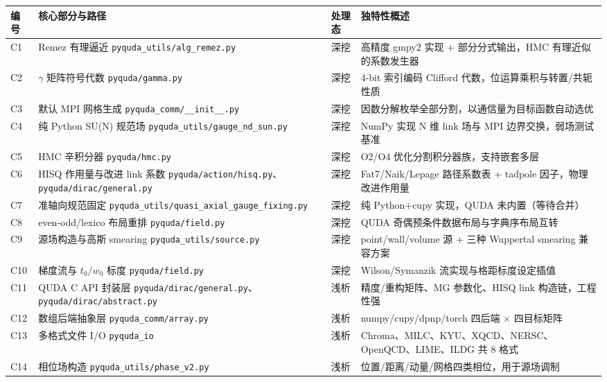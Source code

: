 \documentclass[UTF8]{ctexart}
\begin{document}
\begin{xltabular}{\textwidth}{lXlX}
\toprule
\textcolor{algo}{编号} & 核心部分与路径 & 处理态 & 独特性概述 \\
\midrule
\endhead
C1 & Remez 有理逼近 \texttt{\nolinkurl{pyquda_utils/alg_remez.py}} & 深挖 & 高精度 gmpy2 实现 + 部分分式输出，HMC 有理近似的系数发生器 \\
C2 & $\gamma$ 矩阵符号代数 \texttt{\nolinkurl{pyquda/gamma.py}} & 深挖 & 4-bit 索引编码 Clifford 代数，位运算乘积与转置/共轭性质 \\
C3 & 默认 MPI 网格生成 \texttt{\nolinkurl{pyquda_comm/__init__.py}} & 深挖 & 因数分解枚举全部分割，以通信量为目标函数自动选优 \\
C4 & 纯 Python SU(N) 规范场 \texttt{\nolinkurl{pyquda_utils/gauge_nd_sun.py}} & 深挖 & NumPy 实现 N 维 link 场与 MPI 边界交换，弱场测试基准 \\
C5 & HMC 辛积分器 \texttt{\nolinkurl{pyquda/hmc.py}} & 深挖 & O2/O4 优化分割积分器族，支持嵌套多层 \\
C6 & HISQ 作用量与改进 link 系数 \texttt{\nolinkurl{pyquda/action/hisq.py}}、\texttt{\nolinkurl{pyquda/dirac/general.py}} & 深挖 & Fat7/Naik/Lepage 路径系数表 + tadpole 因子，物理改进作用量 \\
C7 & 准轴向规范固定 \texttt{\nolinkurl{pyquda_utils/quasi_axial_gauge_fixing.py}} & 深挖 & 纯 Python+cupy 实现，QUDA 未内置（等待合并） \\
C8 & even-odd/lexico 布局重排 \texttt{\nolinkurl{pyquda/field.py}} & 深挖 & QUDA 奇偶预条件数据布局与字典序布局互转 \\
C9 & 源场构造与高斯 smearing \texttt{\nolinkurl{pyquda_utils/source.py}} & 深挖 & point/wall/volume 源 + 三种 Wuppertal smearing 兼容方案 \\
C10 & 梯度流与 $t_0/w_0$ 标度 \texttt{\nolinkurl{pyquda/field.py}} & 深挖 & Wilson/Symanzik 流实现与格距标度设定插值 \\
C11 & QUDA C API 封装层 \texttt{\nolinkurl{pyquda/dirac/general.py}}、\texttt{\nolinkurl{pyquda/dirac/abstract.py}} & 浅析 & 精度/重构矩阵、MG 参数化、HISQ link 构造链，工程性强 \\
C12 & 数组后端抽象层 \texttt{\nolinkurl{pyquda_comm/array.py}} & 浅析 & numpy/cupy/dpnp/torch 四后端 $\times$ 四目标矩阵 \\
C13 & 多格式文件 I/O \texttt{\nolinkurl{pyquda_io}} & 浅析 & Chroma、MILC、KYU、XQCD、NERSC、OpenQCD、LIME、ILDG 共 8 格式 \\
C14 & 相位场构造 \texttt{\nolinkurl{pyquda_utils/phase_v2.py}} & 浅析 & 位置/距离/动量/网格四类相位，用于源场调制 \\

\end{xltabular}
\end{document}
